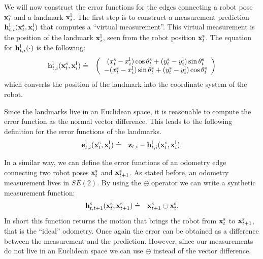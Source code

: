 \documentclass[a4paper]{article}
\begin{document}
We will now construct the error functions for the edges connecting a
robot pose $\mathbf{x}^\mathrm{s}_t$ and a landmark $\mathbf{x}^\mathrm{l}_i$.  The
first step is to construct a measurement prediction
$\mathbf{h}^\mathrm{l}_{t,i}(\mathbf{x}^\mathrm{s}_t, \mathbf{x}^\mathrm{l}_i)$ that computes
a ``virtual measurement''. This virtual measurement is the position of
the landmark $\mathbf{x}^\mathrm{l}_i$, seen from the robot position
$\mathbf{x}^\mathrm{s}_t$. The equation for $\mathbf{h}^\mathrm{l}_{t,i}(\cdot)$ is the
following:
\begin{eqnarray}
    \mathbf{h}^\mathrm{l}_{t,i}(\mathbf{x}^\mathrm{s}_t, \mathbf{x}^\mathrm{l}_i)   & \doteq &
    \left(
    \begin{array}{c}
        (x^\mathrm{s}_t - x^\mathrm{l}_i)  \cos \theta^\mathrm{s}_t + (y^\mathrm{s}_t - y^\mathrm{l}_i) \sin \theta^\mathrm{s}_t \\
      - (x^\mathrm{s}_t - x^\mathrm{l}_i)  \sin \theta^\mathrm{s}_t + (y^\mathrm{s}_t - y^\mathrm{l}_i) \cos \theta^\mathrm{s}_t
    \end{array}
    \right)
\end{eqnarray}
which converts the position of the landmark into the coordinate system of
the robot.

Since the landmarks live in an Euclidean space, it is reasonable to
compute the error function as the normal vector difference.  This
leads to the following definition for the error functions of the
landmarks.
\begin{eqnarray}
    \mathbf{e}^\mathrm{l}_{t,i}(\mathbf{x}^\mathrm{s}_t, \mathbf{x}^\mathrm{l}_i)   & \doteq & \mathbf{z}_{t,i} - \mathbf{h}^\mathrm{l}_{t,i}(\mathbf{x}^\mathrm{s}_t, \mathbf{x}^\mathrm{l}_i).
    \label{eq:landmarkError}
\end{eqnarray}

In a similar way, we can define the error functions of an odometry
edge connecting two robot poses $\mathbf{x}^\mathrm{s}_t$ and
$\mathbf{x}^\mathrm{s}_{t+1}$. As stated before, an odometry measurement lives in $SE(2)$.
By using the $\ominus$ operator we can write a synthetic measurement function:
\begin{eqnarray}
    \mathbf{h}^\mathrm{s}_{t,t+1}(\mathbf{x}^\mathrm{s}_t, \mathbf{x}^\mathrm{s}_{t+1})   & \doteq & \mathbf{x}^\mathrm{s}_{t+1} \ominus \mathbf{x}^\mathrm{s}_{t}.
\end{eqnarray}
In short this function returns the motion that brings the robot from
$\mathbf{x}^\mathrm{s}_t$ to $\mathbf{x}^\mathrm{s}_{t+1}$, that is the ``ideal''
odometry.  Once again the error can be obtained as a difference
between the measurement and the prediction. However, since our measurements
do not live in an Euclidean space we can use $\ominus$ instead of the vector difference.
\end{document}
